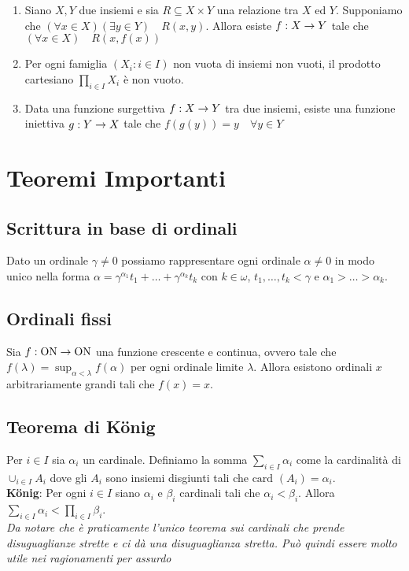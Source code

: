 \documentclass[a4paper,NoNotes,GeneralMath]{stdmdoc}
\newcommand{\card}[1]{\text{card }({#1})}
\newcommand{\ON}{\text{ON}}
\begin{document}
\begin{itemize}
\begin{enumerate}
				\item Siano $X, Y$ due insiemi e sia $R \subseteq X \times Y$ una relazione tra $X$ ed $Y$. Supponiamo che $(\forall x \in X)(\exists y \in Y) \quad R(x, y)$. Allora esiste $f: X \rightarrow Y$ tale che $(\forall x \in X) \quad R(x, f(x))$
				\item Per ogni famiglia $(X_i : i \in I)$ non vuota di insiemi non vuoti, il prodotto cartesiano $\prod_{i \in I} X_i$ è non vuoto.
				\item Data una funzione surgettiva $f: X \rightarrow Y$ tra due insiemi, esiste una funzione iniettiva $g: Y \rightarrow X$ tale che $f(g(y)) = y \quad \forall y \in Y$
			\end{enumerate}
	\end{itemize}
	
	\section*{Teoremi Importanti}
	\subsection{Scrittura in base di ordinali}
	Dato un ordinale $\gamma \neq 0$ possiamo rappresentare ogni ordinale $\alpha \neq 0$ in modo unico nella forma $\alpha = \gamma^{\alpha_1} t_1 + \ldots + \gamma^{\alpha_k} t_k$ con $k \in \omega$, $t_1, \ldots, t_k < \gamma$ e $\alpha_1 > \ldots > \alpha_k$.
	
	\subsection{Ordinali fissi}
	Sia $f: \ON \rar \ON$ una funzione crescente e continua, ovvero tale che $f(\lambda) = \sup_{\alpha < \lambda} f(\alpha)$ per ogni ordinale limite $\lambda$. Allora esistono ordinali $x$ arbitrariamente grandi tali che $f(x) = x$.
	
	\subsection{Teorema di König}
	Per $i \in I$ sia $\alpha_i$ un cardinale. Definiamo la somma $\sum_{i \in I} \alpha_i$ come la cardinalità di $\cup_{i \in I} A_i$ dove gli $A_i$ sono insiemi disgiunti tali che $\card{A_i} = \alpha_i$. \\
	{\bf König}: Per ogni $i \in I$ siano $\alpha_i$ e $\beta_i$ cardinali tali che $\alpha_i < \beta_i$. Allora $\sum_{i \in I} \alpha_i < \prod_{i \in I} \beta_i$. \\
	{\it Da notare che è praticamente l'unico teorema sui cardinali che prende disuguaglianze strette e ci dà una disuguaglianza stretta. Può quindi essere molto utile nei ragionamenti per assurdo}
	
\end{document}
